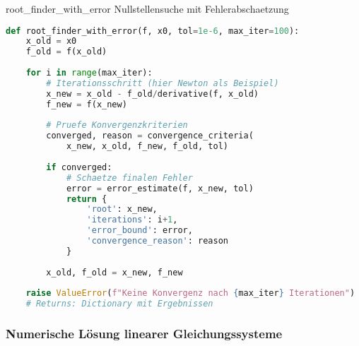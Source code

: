 \begin{examplecode}{root\_finder\_with\_error}
    Nullstellensuche mit Fehlerabschaetzung
\begin{lstlisting}[language=Python, style=basesmol]
def root_finder_with_error(f, x0, tol=1e-6, max_iter=100):
    x_old = x0
    f_old = f(x_old)
    
    for i in range(max_iter):
        # Iterationsschritt (hier Newton als Beispiel)
        x_new = x_old - f_old/derivative(f, x_old)
        f_new = f(x_new)
        
        # Pruefe Konvergenzkriterien
        converged, reason = convergence_criteria(
            x_new, x_old, f_new, f_old, tol)
            
        if converged:
            # Schaetze finalen Fehler
            error = error_estimate(f, x_new, tol)
            return {
                'root': x_new,
                'iterations': i+1,
                'error_bound': error,
                'convergence_reason': reason
            }
      
        x_old, f_old = x_new, f_new
        
    raise ValueError(f"Keine Konvergenz nach {max_iter} Iterationen")
    # Returns: Dictionary mit Ergebnissen
\end{lstlisting}
\end{examplecode}

\subsubsection{Numerische Lösung linearer Gleichungssysteme}


